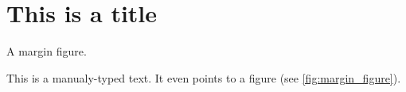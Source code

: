 \section{This is a title}\label{sec:title}
\lipsum[2-2]

\begin{marginfigure}
    \begin{center}
    \end{center}
    \caption{A margin figure.}
    \label{fig:margin_figure}
\end{marginfigure}

This is a manualy-typed text. It even points to a figure (see \autoref{fig:margin_figure}).
